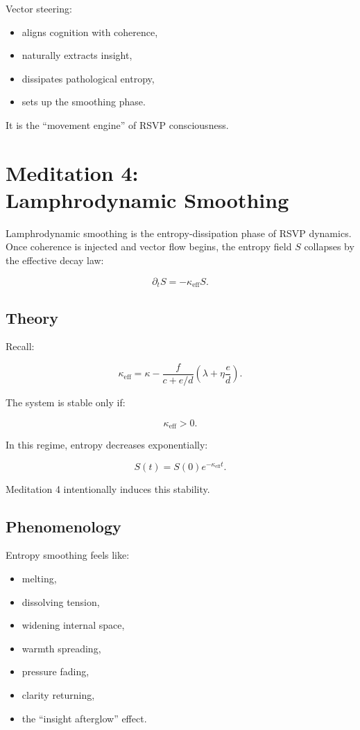 \documentclass[12pt]{article}
\begin{document}
Vector steering:

\begin{itemize}
    \item aligns cognition with coherence,
    \item naturally extracts insight,
    \item dissipates pathological entropy,
    \item sets up the smoothing phase.
\end{itemize}

It is the ``movement engine'' of RSVP consciousness.


\chapter{Meditation 4:\\ Lamphrodynamic Smoothing}

Lamphrodynamic smoothing is the entropy-dissipation phase of RSVP dynamics.
Once coherence is injected and vector flow begins, the entropy field $S$ collapses
by the effective decay law:

\[
\partial_t S = -\kappa_{\mathrm{eff}} S.
\]

\section{Theory}

Recall:

\[
\kappa_{\mathrm{eff}}
=
\kappa
-
\frac{f}{c + e/d}
\left(
\lambda
+ \eta\frac{e}{d}
\right).
\]

The system is stable only if:

\[
\kappa_{\mathrm{eff}} > 0.
\]

In this regime, entropy decreases exponentially:

\[
S(t) = S(0) e^{-\kappa_{\mathrm{eff}} t}.
\]

Meditation 4 intentionally induces this stability.

\section{Phenomenology}

Entropy smoothing feels like:

\begin{itemize}
    \item melting,
    \item dissolving tension,
    \item widening internal space,
    \item warmth spreading,
    \item pressure fading,
    \item clarity returning,
    \item the ``insight afterglow'' effect.
\end{itemize}
\end{document}
